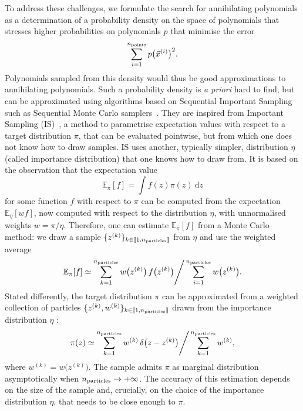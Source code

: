 \documentclass[11pt,a4paper]{article}
\renewcommand{\d}{\ensuremath{\mathrm{d}}\xspace}
\begin{document}
	To address these challenges, we formulate the search for annihilating polynomials as a determination of a probability density on the space of polynomials that stresses higher probabilities on polynomials $p$ that minimise the error
	\begin{equation}
		\sum_{i=1}^{n_{\rm points}}p\big(\vec{x}^{(i)}\big)^{2}.
	\end{equation}
	Polynomials sampled from this density would thus be good approximations to annihilating polynomials. Such a probability density is \textit{a priori} hard to find, but can be approximated using algorithms based on Sequential Important Sampling~\cite{Doucet2001,Liu2004} such as Sequential Monte Carlo samplers~\cite{del2006sequential}. They are inspired from Important Sampling (IS)~\cite{osti_4441935,RobertCasella2004}, a method to parametrise expectation values with respect to a target distribution $\pi$, that can be evaluated pointwise, but from which one does not know how to draw samples. IS uses another, typically simpler, distribution $\eta$ (called importance distribution) that one knows how to draw from. It is based on the observation that the expectation value
	\begin{equation}
		\mathbb{E}_{\pi}[f] = \int f(z)\pi(z)\ \d z
	\end{equation}
	for some function $f$ with respect to $\pi$ can be computed from the expectation $\mathbb{E}_{\eta}[w f]$, now computed with respect to the distribution $\eta$, with unnormalised weights $w = \pi/\eta$. Therefore, one can estimate $\mathbb{E}_{\pi}[f]$ from a Monte Carlo method: we draw a sample $\{z^{(k)}\}_{k\in\llbracket 1, n_{\rm particles}\rrbracket}$ from $\eta$ and use the weighted average
	\begin{equation}
		\mathbb{E}_{\pi}[f] \simeq \displaystyle \sum_{k=1}^{n_{\rm particles}} w\big(z^{(k)}\big)\,f\big(z^{(k)}\big)\Bigg/\displaystyle \sum_{i=1}^{n_{\rm particles}} w\big(z^{(k)}\big).
	\end{equation}
	Stated differently, the target distribution $\pi$ can be approximated from a weighted collection of particles $\{z^{(k)},w^{(k)}\}_{k\in\llbracket 1, n_{\rm particles}\rrbracket}$ drawn from the importance distribution $\eta$ :
	\begin{equation}
		\pi(z) \simeq \displaystyle \sum_{k=1}^{n_{\rm particles}} w^{(k)}\,\delta\big(z-z^{(k)}\big)\Bigg/\displaystyle \sum_{k=1}^{n_{\rm particles}} w^{(k)},
	\end{equation}
	where $w^{(k)} = w\big(z^{(k)}\big)$. The sample admits $\pi$ as marginal distribution asymptotically when $n_{\rm particles}\rightarrow+\infty$. The accuracy of this estimation depends on the size of the sample and, crucially, on the choice of the importance distribution $\eta$, that needs to be close enough to $\pi$. 
	
\end{document}
